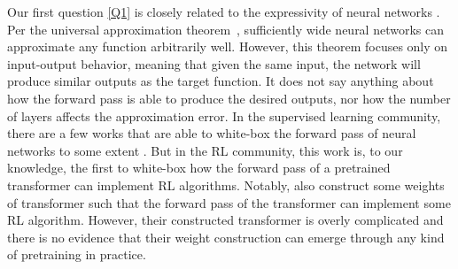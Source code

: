 \documentclass{article}
\newcommand{\ehb}[1]{({\color{violet} {Ethan: #1}})}
\newcommand{\sz}[1]{({\color{red} {Shangtong: #1}})}
\begin{document}
Our first question \ref{Q1} is closely related to the expressivity of neural networks \citep{siegelmann1992computational,graves2014neural,jastrzkebski2017residual,hochreiter2001meta, lu2017expressive}.
Per the universal approximation theorem~\citep{hornik1989universal, cybenko1989approximation,leshno1993multilayer,bengio2017deep},
sufficiently wide neural networks can approximate any function arbitrarily well.
However, this theorem focuses only on input-output behavior, meaning that given the same input, the network will produce similar outputs as the target function.
It does not say anything about how the forward pass is able to produce the desired outputs, nor how the number of layers affects the approximation error.
In the supervised learning community, there are a few works that are able to white-box the forward pass of neural networks to some extent \citep{frosst2017distilling, alvarez2018towards,chan2022redunet,yu2023white,vonoswald2023transformers,ahn2024transformers}. 
But in the RL community, this work is, to our knowledge, the first to white-box how the forward pass of a pretrained transformer can implement RL algorithms.
Notably, \citet{lin2023transformers} also construct some weights of transformer such that the forward pass of the transformer can implement some RL algorithm.
However,
their constructed transformer is overly complicated and there is no evidence that their weight construction can emerge through any kind of pretraining in practice.
\end{document}
